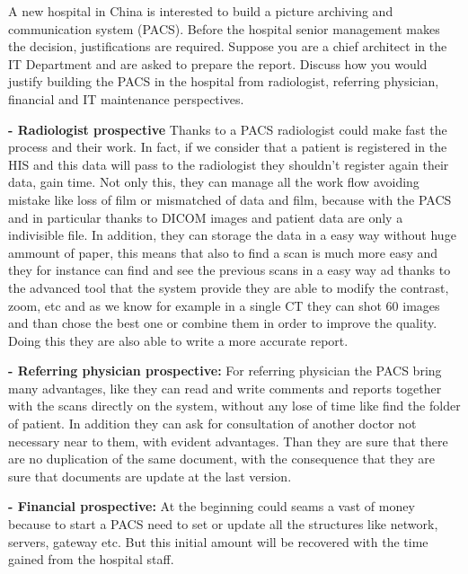 \documentclass[a4 paper,12pt]{article}
\begin{document}

    A new hospital in China is interested to build a picture archiving and communication system (PACS). Before the hospital senior management makes the decision, justifications are required. Suppose you are a chief architect in the IT Department and are asked to prepare the report. Discuss how you would justify building the PACS in the hospital from radiologist, referring physician, financial and IT maintenance perspectives.
    
    \solution
    
    \textbf{- Radiologist prospective} 
        Thanks to a PACS radiologist could make fast the process and their work. In fact, if we consider that a patient is registered in the HIS and this data will pass to the radiologist they shouldn't register again their data, gain time. Not only this, they can manage all the work flow avoiding mistake like loss of film or mismatched of data and film, because with the PACS and in particular thanks to DICOM images and patient data are only a indivisible file.
        In addition, they can storage the data in a easy way without huge ammount of paper, this means that also to find a scan is much more easy and they for instance can find and see the previous scans in a easy way ad thanks to the advanced tool that the system provide they are able to modify the contrast, zoom, etc and as we know for example in a single CT they can shot 60 images and than chose the best one or combine them in order to improve the quality. Doing this they are also able to write a more accurate report.
        
    \textbf{- Referring physician prospective:} 
        For referring physician the PACS bring many advantages, like they can read and write comments and reports together with the scans directly on the system, without any lose of time like find the folder of patient. In addition they can ask for consultation of another doctor not necessary near to them, with evident advantages. Than they are sure that there are no duplication of the same document, with the consequence that they are sure that documents are update at the last version.
    
    \textbf{- Financial prospective:} 
        At the beginning could seams a vast of money because to start a PACS need to set or update all the structures like network, servers, gateway etc.
        But this initial amount will be recovered with the time gained from the hospital staff.
        
\end{document}
